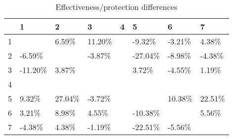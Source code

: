 \begin{table}[ht]
\centering
\begin{tabular}{rlllllll}
  \hline
 & 1 & 2 & 3 & 4 & 5 & 6 & 7 \\ 
  \hline
1 &  & 6.59\% & 11.20\% &  & -9.32\% & -3.21\% & 4.38\% \\ 
  2 & -6.59\% &  & -3.87\% &  & -27.04\% & -8.98\% & -4.38\% \\ 
  3 & -11.20\% & 3.87\% &  &  & 3.72\% & -4.55\% & 1.19\% \\ 
  4 &  &  &  &  &  &  &  \\ 
  5 & 9.32\% & 27.04\% & -3.72\% &  &  & 10.38\% & 22.51\% \\ 
  6 & 3.21\% & 8.98\% & 4.55\% &  & -10.38\% &  & 5.56\% \\ 
  7 & -4.38\% & 4.38\% & -1.19\% &  & -22.51\% & -5.56\% &  \\ 
   \hline
\end{tabular}
\caption{Effectiveness/protection differences} 
\end{table}

